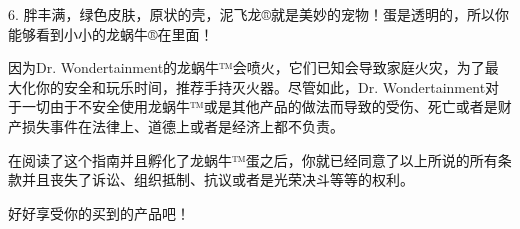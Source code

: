 \begin{scpbox}
6. 胖丰满，绿色皮肤，原状的壳，泥飞龙®就是美妙的宠物！蛋是透明的，所以你能够看到小小的龙蜗牛®在里面！

因为Dr. Wondertainment的龙蜗牛™会喷火，它们已知会导致家庭火灾，为了最大化你的安全和玩乐时间，推荐手持灭火器。尽管如此，Dr. Wondertainment对于一切由于不安全使用龙蜗牛™或是其他产品的做法而导致的受伤、死亡或者是财产损失事件在法律上、道德上或者是经济上都不负责。

在阅读了这个指南并且孵化了龙蜗牛™蛋之后，你就已经同意了以上所说的所有条款并且丧失了诉讼、组织抵制、抗议或者是光荣决斗等等的权利。

好好享受你的买到的产品吧！

\end{scpbox}
